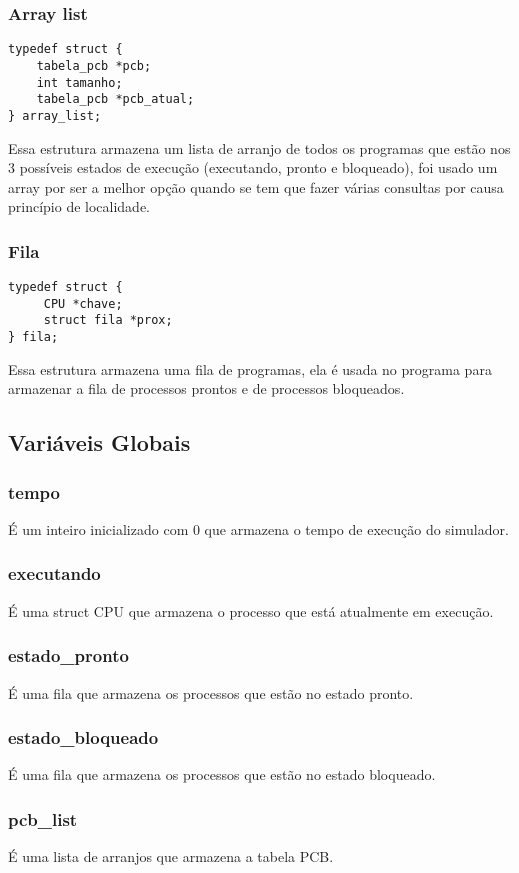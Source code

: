 \documentclass[a4paper, 12pt]{article}
\begin{document}
\subsubsection{Array list}
\begin{verbatim}
typedef struct {
    tabela_pcb *pcb;
    int tamanho;
    tabela_pcb *pcb_atual;
} array_list;
\end{verbatim}
    Essa estrutura armazena um lista de arranjo de todos os programas que estão nos 3 possíveis estados de execução (executando, pronto e bloqueado), foi usado um array por ser a melhor opção quando se tem que fazer várias consultas por causa princípio de localidade.
\subsubsection{Fila}
\begin{verbatim}
typedef struct {
     CPU *chave;
     struct fila *prox;
} fila;
\end{verbatim}
    Essa estrutura armazena uma fila de programas, ela é usada no programa para armazenar a fila de processos prontos e de processos bloqueados.

\subsection{Variáveis Globais}
 
     \subsubsection{tempo} É um inteiro inicializado com 0 que armazena o tempo de execução do simulador.
     \subsubsection{executando} É uma struct CPU que armazena o processo que está atualmente em execução.
     \subsubsection{estado\_pronto}  É uma fila que armazena os processos que estão no estado pronto.
     \subsubsection{estado\_bloqueado} É uma fila que armazena os processos que estão no estado bloqueado.
     \subsubsection{pcb\_list} É uma lista de arranjos que armazena a tabela PCB.
\end{document}
